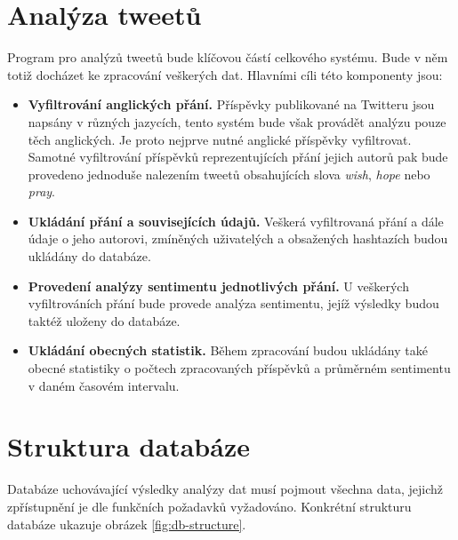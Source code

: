 \documentclass[thesis=B,czech]{FITthesis}[2012/06/26]
\begin{document}
\section{Analýza tweetů}
	Program pro analýzů tweetů bude klíčovou částí celkového systému. Bude v něm totiž docházet ke zpracování veškerých dat. Hlavními cíli této komponenty jsou:
	
\begin{itemize}
\item \textbf{Vyfiltrování anglických přání.} Příspěvky publikované na Twitteru jsou napsány v různých jazycích, tento systém bude však provádět analýzu pouze těch anglických. Je proto nejprve nutné anglické příspěvky vyfiltrovat. Samotné vyfiltrování příspěvků reprezentujících přání jejich autorů pak bude provedeno jednoduše nalezením tweetů obsahujících slova \textit{wish}, \textit{hope} nebo \textit{pray}. 
\item \textbf{Ukládání přání a souvisejících údajů.} Veškerá vyfiltrovaná přání a dále údaje o jeho autorovi, zmíněných uživatelých a obsažených hashtazích budou ukládány do databáze. 
\item \textbf{Provedení analýzy sentimentu jednotlivých přání.} U veškerých vyfiltrováních přání bude provede analýza sentimentu, jejíž výsledky budou taktéž uloženy do databáze. 
\item \textbf{Ukládání obecných statistik.} Během zpracování budou ukládány také obecné statistiky o počtech zpracovaných příspěvků a průměrném sentimentu v daném časovém intervalu. 
\end{itemize}

\section{Struktura databáze}
Databáze uchovávající výsledky analýzy dat musí pojmout všechna data, jejichž zpřístupnění je dle funkčních požadavků vyžadováno. Konkrétní strukturu databáze ukazuje obrázek \ref{fig:db-structure}. 
\end{document}
